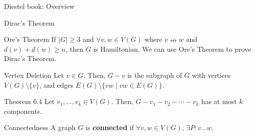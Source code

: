 \documentclass[10pt]{extarticle}
\begin{document}
\begin{problem}{Diestel book: Overview}
\begin{problem}{Dirac's Theorem}
\begin{description}
      \end{description}
    \end{problem}
    \begin{problem}{Ore's Theorem}
      If $|G| \geq 3$ and $\forall v,w\in V(G)$ where $v \nleftrightarrow w$ and $d(v) + d(w) \geq n$, then $G$ is Hamiltonian.
      \tcblower
      We can use Ore's Theorem to prove Dirac's Theorem.
    \end{problem}
    \begin{problem}{Vertex Deletion}
      Let $v\in G$. Then, $G-v$ is the subgraph of $G$ with vertices $V(G)\setminus \{v\}$, and edges $E(G)\setminus \{vw\mid vw\in E(G)\}$.
    \end{problem}
    \begin{problem}{Theorem 6.4}
      Let $v_1,\dots,v_k\in V(G)$. Then, $G-v_1-v_2-\cdots-v_k$ has at most $k$ components.
      \begin{problem}{Connectedness}
        A graph $G$ is \textbf{connected} if $\forall v,w\in V(G)$, $\exists P: v\dots w$.
      \end{problem}
    \end{problem}
  \end{problem}
\end{document}
